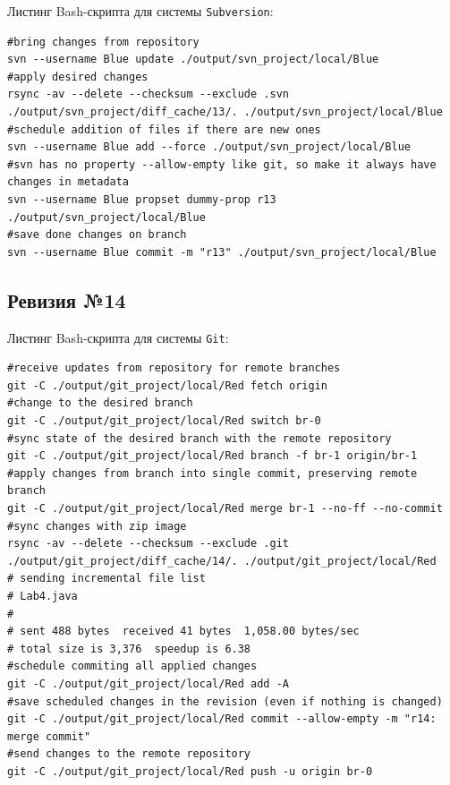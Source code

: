 Листинг Bash-скрипта для системы \texttt{Subversion}:
\begin{lstlisting}
#bring changes from repository
svn --username Blue update ./output/svn_project/local/Blue
#apply desired changes
rsync -av --delete --checksum --exclude .svn ./output/svn_project/diff_cache/13/. ./output/svn_project/local/Blue
#schedule addition of files if there are new ones
svn --username Blue add --force ./output/svn_project/local/Blue
#svn has no property --allow-empty like git, so make it always have changes in metadata
svn --username Blue propset dummy-prop r13 ./output/svn_project/local/Blue
#save done changes on branch
svn --username Blue commit -m "r13" ./output/svn_project/local/Blue
\end{lstlisting}


\subsection{Ревизия №14}

Листинг Bash-скрипта для системы \texttt{Git}:
\begin{lstlisting}
#receive updates from repository for remote branches
git -C ./output/git_project/local/Red fetch origin
#change to the desired branch
git -C ./output/git_project/local/Red switch br-0
#sync state of the desired branch with the remote repository
git -C ./output/git_project/local/Red branch -f br-1 origin/br-1
#apply changes from branch into single commit, preserving remote branch
git -C ./output/git_project/local/Red merge br-1 --no-ff --no-commit
#sync changes with zip image
rsync -av --delete --checksum --exclude .git ./output/git_project/diff_cache/14/. ./output/git_project/local/Red
# sending incremental file list
# Lab4.java
# 
# sent 488 bytes  received 41 bytes  1,058.00 bytes/sec
# total size is 3,376  speedup is 6.38
#schedule commiting all applied changes
git -C ./output/git_project/local/Red add -A
#save scheduled changes in the revision (even if nothing is changed)
git -C ./output/git_project/local/Red commit --allow-empty -m "r14: merge commit"
#send changes to the remote repository
git -C ./output/git_project/local/Red push -u origin br-0
\end{lstlisting}

